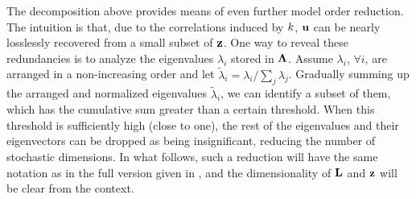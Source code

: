 The decomposition above provides means of even further model order reduction. The intuition is that, due to the correlations induced by $\fCov$, $\mathbf{u}$ can be nearly losslessly recovered from a small subset of $\mathbf{z}$. One way to reveal these redundancies is to analyze the eigenvalues $\lambda_i$ stored in $\mathbf{\Lambda}$. Assume $\lambda_i$, $\forall i$, are arranged in a non-increasing order and let $\tilde{\lambda}_i = \lambda_i / \sum_j \lambda_j$. Gradually summing up the arranged and normalized eigenvalues $\tilde{\lambda}_i$, we can identify a subset of them, which has the cumulative sum greater than a certain threshold. When this threshold is sufficiently high (close to one), the rest of the eigenvalues and their eigenvectors can be dropped as being insignificant, reducing the number of stochastic dimensions. In what follows, such a reduction will have the same notation as in the full version given in , and the dimensionality of $\mathbf{L}$ and $\mathbf{z}$ will be clear from the context.
